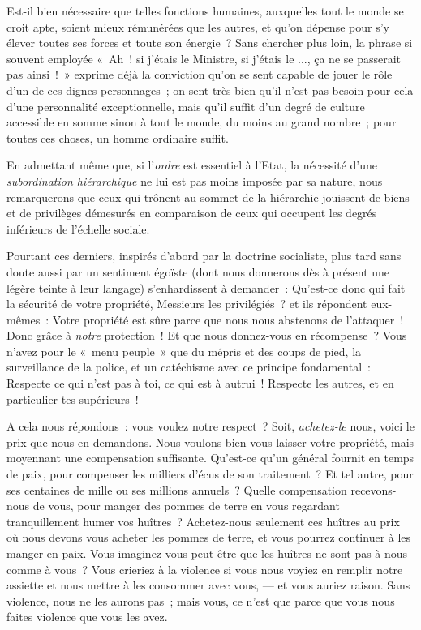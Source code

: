 \documentclass[french,twoside]{book} %
\begin{document}
Est-il bien nécessaire que telles fonctions humaines, auxquelles tout le monde se croit apte, soient mieux rémunérées que les autres, et qu’on dépense pour s’y élever toutes ses forces et toute son énergie ? Sans chercher plus loin, la phrase si souvent employée « Ah ! si j’étais le Ministre, si j’étais le ..., ça ne se passerait pas ainsi ! » exprime déjà la conviction qu’on se sent capable de jouer le rôle d’un de ces dignes personnages ; on sent très bien qu’il n’est pas besoin pour cela d’une personnalité exceptionnelle, mais qu’il suffit d’un degré de culture accessible en somme sinon à tout le monde, du moins au grand nombre ; pour toutes ces choses, un homme ordinaire suffit.\par
En admettant même que, si l’\emph{ordre} est essentiel à l’Etat, la nécessité d’une \emph{subordination hiérarchique }ne lui est pas moins imposée par sa nature, nous remarquerons que ceux qui trônent au sommet de la hiérarchie jouissent de biens et de privilèges démesurés en comparaison de ceux qui occupent les degrés inférieurs de l’échelle sociale.\par
Pourtant ces derniers, inspirés d’abord par la doctrine socialiste, plus tard sans doute aussi par un sentiment égoïste (dont nous donnerons dès à présent une légère teinte à leur langage) s’enhardissent à demander : Qu’est-ce donc qui fait la sécurité de votre propriété, Messieurs les privilégiés ? et ils répondent eux-mêmes : Votre propriété est sûre parce que nous nous abstenons de l’attaquer ! Donc grâce à \emph{notre} protection ! Et que nous donnez-vous en récompense ?  Vous n’avez pour le « menu peuple » que du mépris et des coups de pied, la surveillance de la police, et un catéchisme avec ce principe fondamental : Respecte ce qui n’est pas à toi, ce qui est à autrui ! Respecte les autres, et en particulier tes supérieurs !\par
A cela nous répondons : vous voulez notre respect ? Soit, \emph{achetez-le} nous, voici le prix que nous en demandons. Nous voulons bien vous laisser votre propriété, mais moyennant une compensation suffisante. Qu’est-ce qu’un général fournit en temps de paix, pour compenser les milliers d’écus de son traitement ? Et tel autre, pour ses centaines de mille ou ses millions annuels ? Quelle compensation recevons-nous de vous, pour manger des pommes de terre en vous regardant tranquillement humer vos huîtres ? Achetez-nous seulement ces huîtres au prix où nous devons vous acheter les pommes de terre, et vous pourrez continuer à les manger en paix. Vous imaginez-vous peut-être que les huîtres ne sont pas à nous comme à vous ? Vous crieriez à la violence si vous nous voyiez en remplir notre assiette et nous mettre à les consommer avec vous, — et vous auriez raison. Sans violence, nous ne les aurons pas ; mais vous, ce n’est que parce que vous nous faites violence que vous les avez.\par
\end{document}
